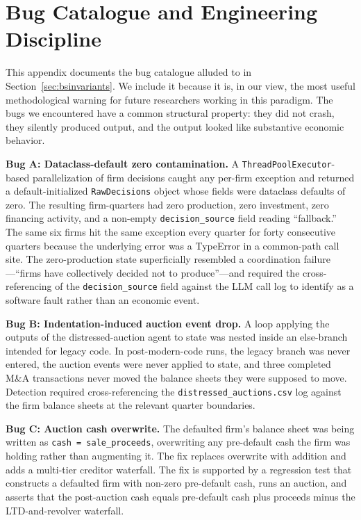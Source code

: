 \documentclass[11pt]{article}
\begin{document}
\section{Bug Catalogue and Engineering Discipline}\label{app:bugs}

This appendix documents the bug catalogue alluded to in
Section~\ref{sec:bsinvariants}. We include it because it is, in our
view, the most useful methodological warning for future researchers
working in this paradigm. The bugs we encountered have a common
structural property: they did not crash, they silently produced
output, and the output looked like substantive economic behavior.

\textbf{Bug A: Dataclass-default zero contamination.} A
\texttt{ThreadPoolExecutor}-based parallelization of firm decisions
caught any per-firm exception and returned a default-initialized
\texttt{RawDecisions} object whose fields were dataclass defaults of
zero. The resulting firm-quarters had zero production, zero
investment, zero financing activity, and a non-empty
\texttt{decision\_source} field reading ``fallback.'' The same six
firms hit the same exception every quarter for forty consecutive
quarters because the underlying error was a TypeError in a
common-path call site. The zero-production state superficially
resembled a coordination failure---``firms have collectively decided
not to produce''---and required the cross-referencing of the
\texttt{decision\_source} field against the LLM call log to identify
as a software fault rather than an economic event.

\textbf{Bug B: Indentation-induced auction event drop.} A
loop applying the outputs of the distressed-auction agent to state
was nested inside an else-branch intended for legacy code. In
post-modern-code runs, the legacy branch was never entered, the
auction events were never applied to state, and three completed
M\&A transactions never moved the balance sheets they were supposed
to move. Detection required cross-referencing the
\texttt{distressed\_auctions.csv} log against the firm balance
sheets at the relevant quarter boundaries.

\textbf{Bug C: Auction cash overwrite.} The defaulted firm's
balance sheet was being written as
\texttt{cash = sale\_proceeds}, overwriting any pre-default cash the
firm was holding rather than augmenting it. The fix replaces
overwrite with addition and adds a multi-tier creditor waterfall.
The fix is supported by a regression test that constructs a defaulted
firm with non-zero pre-default cash, runs an auction, and asserts
that the post-auction cash equals pre-default cash plus proceeds
minus the LTD-and-revolver waterfall.
\end{document}
